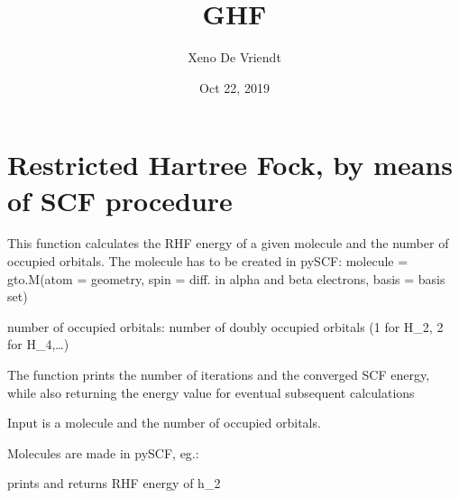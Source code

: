 \documentclass[letterpaper,10pt,english]{sphinxmanual}
\title{GHF}
\date{Oct 22, 2019}
\author{Xeno De Vriendt}
\begin{document}
\pagestyle{empty}
\sphinxmaketitle
\pagestyle{plain}
\sphinxtableofcontents
\pagestyle{normal}
\label{\detokenize{index::doc}}

\label{\detokenize{RHF:module-ghf.RHF}}

\chapter{Restricted Hartree Fock, by means of SCF procedure}
\label{\detokenize{RHF:restricted-hartree-fock-by-means-of-scf-procedure}}\label{\detokenize{RHF::doc}}
This function calculates the RHF energy of a given molecule and the number of occupied orbitals.
The molecule has to be created in pySCF:
molecule = gto.M(atom = geometry, spin = diff. in alpha and beta electrons, basis = basis set)

number of occupied orbitals:
number of doubly occupied orbitals (1 for H\_2, 2 for H\_4,…)

The function prints the number of iterations and the converged SCF energy, while also returning the energy value
for eventual subsequent calculations

\begin{fulllineitems}
\label{\detokenize{RHF:ghf.RHF.RHF}}
Input is a molecule and the number of occupied orbitals.

Molecules are made in pySCF, eg.:

\begin{sphinxVerbatim}[commandchars=\\\{\}]
          
 
\end{sphinxVerbatim}

prints and returns RHF energy of h\_2

\end{fulllineitems}
\end{document}
